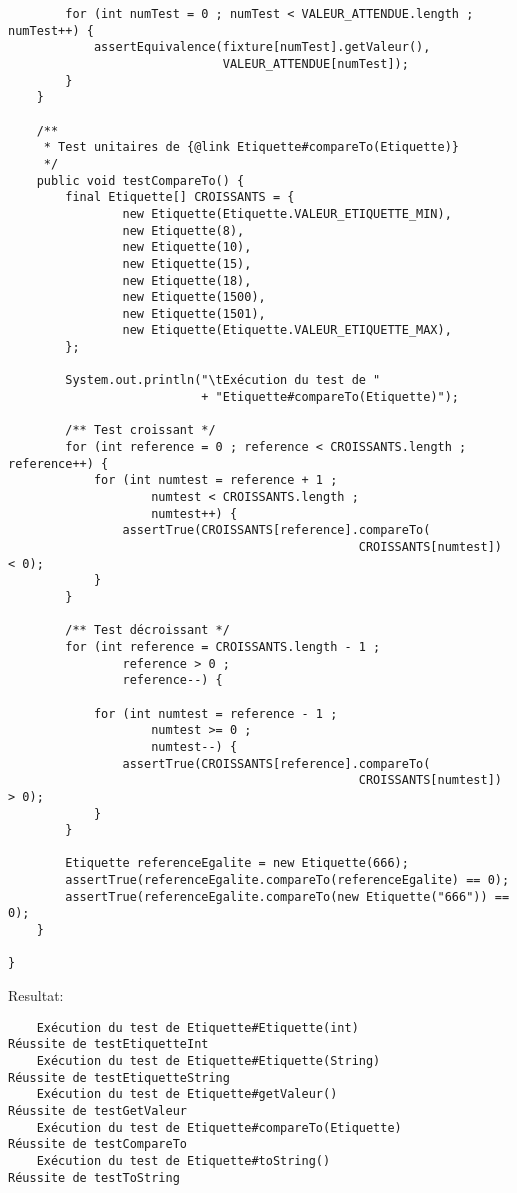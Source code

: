 \begin{enum}
\begin{verbatim}
        for (int numTest = 0 ; numTest < VALEUR_ATTENDUE.length ; numTest++) {
            assertEquivalence(fixture[numTest].getValeur(), 
                              VALEUR_ATTENDUE[numTest]);
        }
    }
    
    /**
     * Test unitaires de {@link Etiquette#compareTo(Etiquette)}
     */
    public void testCompareTo() {
        final Etiquette[] CROISSANTS = {
                new Etiquette(Etiquette.VALEUR_ETIQUETTE_MIN),
                new Etiquette(8),
                new Etiquette(10),
                new Etiquette(15),
                new Etiquette(18),
                new Etiquette(1500),
                new Etiquette(1501),
                new Etiquette(Etiquette.VALEUR_ETIQUETTE_MAX),        
        };
        
        System.out.println("\tExécution du test de "
                           + "Etiquette#compareTo(Etiquette)");
        
        /** Test croissant */
        for (int reference = 0 ; reference < CROISSANTS.length ; reference++) {
            for (int numtest = reference + 1 ; 
                    numtest < CROISSANTS.length ; 
                    numtest++) {
                assertTrue(CROISSANTS[reference].compareTo(
                                                 CROISSANTS[numtest]) < 0);
            }
        }
        
        /** Test décroissant */
        for (int reference = CROISSANTS.length - 1 ; 
                reference > 0 ; 
                reference--) {
            
            for (int numtest = reference - 1 ; 
                    numtest >= 0 ; 
                    numtest--) {
                assertTrue(CROISSANTS[reference].compareTo(
                                                 CROISSANTS[numtest]) > 0);
            }
        }
        
        Etiquette referenceEgalite = new Etiquette(666);
        assertTrue(referenceEgalite.compareTo(referenceEgalite) == 0);
        assertTrue(referenceEgalite.compareTo(new Etiquette("666")) == 0);
    }

}
\end{verbatim}
Resultat:
\begin{verbatim}
    Exécution du test de Etiquette#Etiquette(int)
Réussite de testEtiquetteInt
    Exécution du test de Etiquette#Etiquette(String)
Réussite de testEtiquetteString
    Exécution du test de Etiquette#getValeur()
Réussite de testGetValeur
    Exécution du test de Etiquette#compareTo(Etiquette)
Réussite de testCompareTo
    Exécution du test de Etiquette#toString()
Réussite de testToString
\end{verbatim}


\end{enum}
